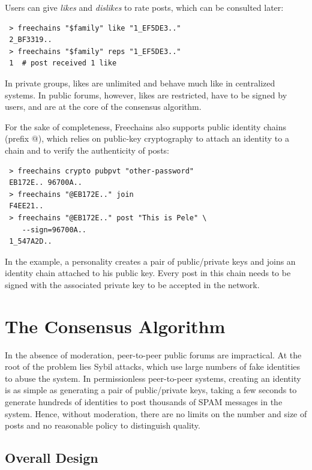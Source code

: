 \documentclass[10pt,journal,compsoc]{IEEEtran}
\newcommand{\FC}        {Freechains\xspace}
\begin{document}
Users can give \emph{likes} and \emph{dislikes} to rate posts, which can be
consulted later:

{\footnotesize
\begin{verbatim}
 > freechains "$family" like "1_EF5DE3.."
 2_BF3319..
 > freechains "$family" reps "1_EF5DE3.."
 1  # post received 1 like
\end{verbatim}
}

In private groups, likes are unlimited and behave much like in centralized
systems.
In public forums, however, likes are restricted, have to be signed by users,
and are at the core of the consensus algorithm.

For the sake of completeness, \FC also supports public identity chains (prefix
$@$), which relies on public-key cryptography to attach an identity to a chain
and to verify the authenticity of posts:

{\footnotesize
\begin{verbatim}
 > freechains crypto pubpvt "other-password"
 EB172E.. 96700A..
 > freechains "@EB172E.." join
 F4EE21..
 > freechains "@EB172E.." post "This is Pele" \
    --sign=96700A..
 1_547A2D..
\end{verbatim}
}

In the example, a personality creates a pair of public/private keys and joins
an identity chain attached to his public key.
Every post in this chain needs to be signed with the associated private key to
be accepted in the network.

\section{The Consensus Algorithm}
\label{sec.consensus}

In the absence of moderation, peer-to-peer public forums are impractical.
At the root of the problem lies Sybil attacks, which use large numbers of fake
identities to abuse the system.
In permissionless peer-to-peer systems, creating an identity is as simple as
generating a pair of public/private keys, taking a few seconds to generate
hundreds of identities to post thousands of SPAM messages in the system.
Hence, without moderation, there are no limits on the number and size of posts
and no reasonable policy to distinguish quality.

\subsection{Overall Design}
\end{document}
